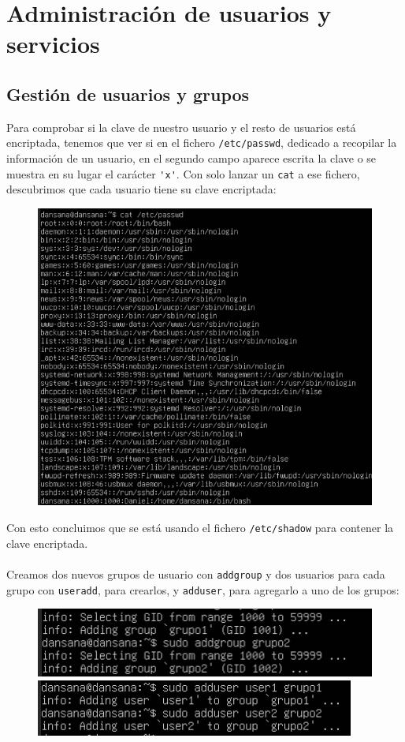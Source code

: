 \documentclass[10pt]{article}
\begin{document}
	\clearpage
	
	\section{Administración de usuarios y servicios}
	\subsection{Gestión de usuarios y grupos}
	Para comprobar si la clave de nuestro usuario y el resto de usuarios está encriptada, tenemos que ver si en el fichero \verb|/etc/passwd|, dedicado a recopilar la información de un usuario, en el segundo campo aparece escrita la clave o se muestra en su lugar el carácter \verb|'x'|. Con solo lanzar un \verb|cat| a ese fichero, descubrimos que cada usuario tiene su clave encriptada:
	\begin{figure}[H]
		\setlength{\abovecaptionskip}{0cm}
		\setlength{\belowcaptionskip}{0cm}
		\centering
		\includegraphics[width=0.6\linewidth]{Recursos/passwd.png}
	\end{figure}
	Con esto concluimos que se está usando el fichero \verb|/etc/shadow| para contener la clave encriptada.\\\\
	Creamos dos nuevos grupos de usuario con \verb|addgroup| y dos usuarios para cada grupo con \verb|useradd|, para crearlos, y \verb|adduser|, para agregarlo a uno de los grupos:
	\begin{figure}[H]
		\centering
		\begin{minipage}{0.48\textwidth}
			\centering
			\includegraphics[width=\linewidth]{Recursos/userNuevos.png}
		\end{minipage}\hfill
		\begin{minipage}{0.48\textwidth}
			\centering
			\includegraphics[width=\linewidth]{Recursos/groupNuevos.png}
		\end{minipage}
	\end{figure}
\end{document}

